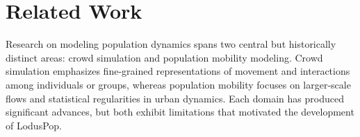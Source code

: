 \documentclass[pdflatex,sn-mathphys-num]{sn-jnl}%
\newcommand\red[1]{#1}
\newcommand\blue[1]{#1}
\theoremstyle{thmstyleone}%
\theoremstyle{thmstyletwo}%
\theoremstyle{thmstylethree}%
\begin{document}

\section{Related Work}
\label{sec:related_work}

\blue{Research on modeling population dynamics spans two central but historically distinct areas: crowd simulation and population mobility modeling. Crowd simulation emphasizes fine-grained representations of movement and interactions among individuals or groups, whereas population mobility focuses on larger-scale flows and statistical regularities in urban dynamics. Each domain has produced significant advances, but both exhibit limitations that motivated the development of LodusPop.}
\end{document}
